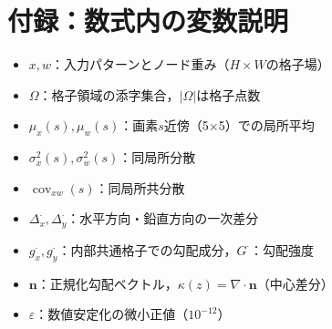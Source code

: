 \documentclass{jarticle}
\theoremstyle{definition}
\begin{document}
\section*{付録：数式内の変数説明}
\begin{itemize}
\item $x,w$：入力パターンとノード重み（$H\times W$の格子場）
\item $\Omega$：格子領域の添字集合，$|\Omega|$は格子点数
\item $\mu_x(s),\mu_w(s)$：画素$s$近傍（5×5）での局所平均
\item $\sigma_x^2(s),\sigma_w^2(s)$：同局所分散
\item $\operatorname{cov}_{xw}(s)$：同局所共分散
\item $\Delta_x^\cdot,\Delta_y^\cdot$：水平方向・鉛直方向の一次差分
\item $g_x^\cdot,g_y^\cdot$：内部共通格子での勾配成分，$G^\cdot$：勾配強度
\item $\bm{n}$：正規化勾配ベクトル，$\kappa(z)=\nabla\cdot\bm{n}$（中心差分）
\item $\varepsilon$：数値安定化の微小正値（$10^{-12}$）
\end{itemize}



\end{document}
